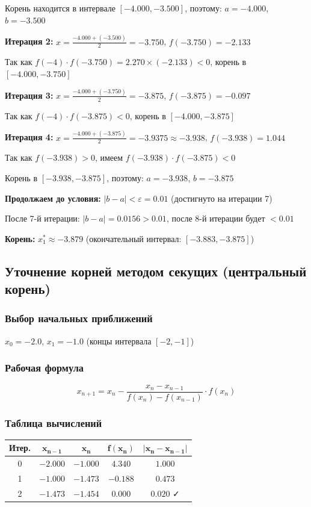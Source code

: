 \documentclass[a4paper,12pt]{article}
\begin{document}
Корень находится в интервале $[-4.000, -3.500]$, поэтому: $a = -4.000$, $b = -3.500$

\textbf{Итерация 2:} $x = \frac{-4.000 + (-3.500)}{2} = -3.750$, $f(-3.750) = -2.133$

Так как $f(-4) \cdot f(-3.750) = 2.270 \times (-2.133) < 0$, корень в $[-4.000, -3.750]$

\textbf{Итерация 3:} $x = \frac{-4.000 + (-3.750)}{2} = -3.875$, $f(-3.875) = -0.097$

Так как $f(-4) \cdot f(-3.875) < 0$, корень в $[-4.000, -3.875]$

\textbf{Итерация 4:} $x = \frac{-4.000 + (-3.875)}{2} = -3.9375 \approx -3.938$, $f(-3.938) = 1.044$

Так как $f(-3.938) > 0$, имеем $f(-3.938) \cdot f(-3.875) < 0$

Корень в $[-3.938, -3.875]$, поэтому: $a = -3.938$, $b = -3.875$

\textbf{Продолжаем до условия:} $|b - a| < \varepsilon = 0.01$ (достигнуто на итерации 7)

После 7-й итерации: $|b - a| = 0.0156 > 0.01$, после 8-й итерации будет $< 0.01$

\textbf{Корень:} $x_1^* \approx -3.879$ (окончательный интервал: $[-3.883, -3.875]$)

\newpage

\subsection{Уточнение корней методом секущих (центральный корень)}

\subsubsection*{Выбор начальных приближений}

$x_0 = -2.0$, $x_1 = -1.0$ (концы интервала $[-2, -1]$)

\subsubsection*{Рабочая формула}
\[
    x_{n+1} = x_n - \frac{x_n - x_{n-1}}{f(x_n) - f(x_{n-1})} \cdot f(x_n)
\]

\subsubsection*{Таблица вычислений}

\begin{center}
\begin{tabular}{|c|c|c|c|c|}
\hline
\textbf{Итер.} & $\mathbf{x_{n-1}}$ & $\mathbf{x_n}$ & $\mathbf{f(x_n)}$ & $\mathbf{|x_n - x_{n-1}|}$ \\
\hline
0 & $-2.000$ & $-1.000$ & $4.340$ & $1.000$ \\
\hline
1 & $-1.000$ & $-1.473$ & $-0.188$ & $0.473$ \\
\hline
2 & $-1.473$ & $-1.454$ & $0.000$ & $0.020$ ✓ \\
\hline
\end{tabular}
\end{center}
\end{document}
